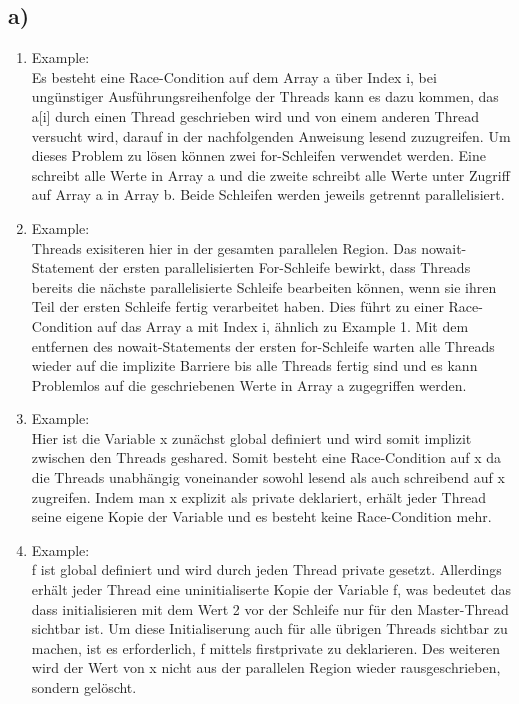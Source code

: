 \documentclass{article}
\begin{document}
    	\subsection{a)}
		\begin{enumerate}
			\item Example: \\
				Es besteht eine Race-Condition auf dem Array a über Index i,
				bei ungünstiger Ausführungsreihenfolge der Threads kann es dazu kommen,
				das a[i] durch einen Thread geschrieben wird und von einem anderen Thread versucht wird, darauf in der nachfolgenden Anweisung lesend zuzugreifen.
				Um dieses Problem zu lösen können zwei for-Schleifen verwendet werden.
				Eine schreibt alle Werte in Array a und die zweite schreibt alle Werte unter Zugriff auf Array a in Array b. 
				Beide Schleifen werden jeweils getrennt parallelisiert.
			\item Example: \\
				Threads exisiteren hier in der gesamten parallelen Region.
				Das nowait-Statement der ersten parallelisierten For-Schleife bewirkt, dass Threads bereits die nächste parallelisierte Schleife bearbeiten können, wenn sie ihren Teil der ersten Schleife fertig verarbeitet haben.
				Dies führt zu einer Race-Condition auf das Array a mit Index i, ähnlich zu Example 1.
				Mit dem entfernen des nowait-Statements der ersten for-Schleife warten alle Threads wieder auf die implizite Barriere bis alle Threads fertig sind und es kann Problemlos auf die geschriebenen Werte in Array a zugegriffen werden.
			\item Example: \\
				Hier ist die Variable x zunächst global definiert und wird somit implizit zwischen den Threads geshared. 
				Somit besteht eine Race-Condition auf x da die Threads unabhängig voneinander sowohl lesend als auch schreibend auf x zugreifen.
				Indem man x explizit als private deklariert, erhält jeder Thread seine eigene Kopie der Variable und es besteht keine Race-Condition mehr.
			\item Example: \\
				f ist global definiert und wird durch jeden Thread private gesetzt. 
				Allerdings erhält jeder Thread eine uninitialiserte Kopie der Variable f, was bedeutet das dass initialisieren mit dem Wert 2 vor der Schleife nur für den Master-Thread sichtbar ist.
				Um diese Initialiserung auch für alle übrigen Threads sichtbar zu machen, ist es erforderlich, f mittels firstprivate zu deklarieren.
				Des weiteren wird der Wert von x nicht aus der parallelen Region wieder rausgeschrieben, sondern gelöscht. 

\end{enumerate}
\end{document}
